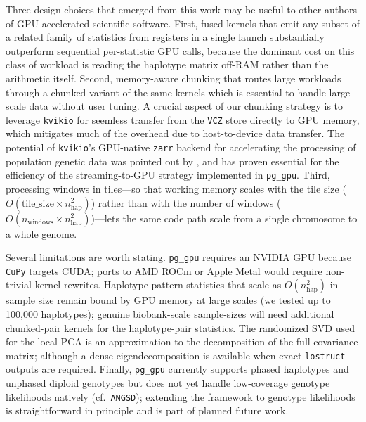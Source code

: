 \documentclass[12pt]{article}
\newcommand{\citep}{\parencite}
\newcommand{\citet}{\textcite}
\newcommand{\pggpu}{\texttt{pg\_gpu}\xspace}
\newcommand{\angsd}{\texttt{ANGSD}\xspace}
\newcommand{\cupy}{\texttt{CuPy}\xspace}
\newcommand{\zarr}{\texttt{zarr}\xspace}
\newcommand{\vcz}{\texttt{VCZ}\xspace}
\newcommand{\lostruct}{\texttt{lostruct}\xspace}
\newcommand{\kvikio}{\texttt{kvikio}\xspace}
\begin{document}
Three design choices that emerged from this work may be useful to
other authors of GPU-accelerated scientific software. First, fused
kernels that emit any subset of a related family of statistics from
registers in a single launch substantially outperform sequential
per-statistic GPU calls, because the dominant cost on this class of
workload is reading the haplotype matrix off-RAM rather than the
arithmetic itself. 
Second, memory-aware chunking that
routes large workloads through a
chunked variant of the same kernels which is 
essential to handle large-scale data without user
tuning. 
A crucial aspect of our chunking strategy is to leverage
\kvikio \citep{kvikio2021} for seemless transfer from the \vcz store
directly to GPU memory, which mitigates much of the overhead 
due to host-to-device data transfer. %
The potential of \kvikio's GPU-native \zarr backend for accelerating 
the processing of population genetic data was pointed out by
\citet{czech2024vcz}, and has proven essential for the efficiency of the
streaming-to-GPU strategy implemented in \pggpu.
Third, processing windows in tiles---so that working memory
scales with the tile size ($O(\text{tile\_size}\times n_{\text{hap}}^2)$)
rather than with the number of windows ($O(n_{\text{windows}}\times n_{\text{hap}}^2)$)---lets
the same code path scale from a single chromosome to a whole genome.

Several limitations are worth stating. \pggpu requires an NVIDIA GPU
because \cupy targets CUDA; ports to AMD ROCm or Apple Metal would
require non-trivial kernel rewrites. Haplotype-pattern statistics
that scale as $O(n_{\text{hap}}^2)$ in sample size remain bound by
GPU memory at large scales (we tested up to 100{,}000 haplotypes);
genuine biobank-scale sample-sizes will need additional chunked-pair
kernels for the haplotype-pair statistics. The randomized SVD
used for the local PCA is an approximation to the
decomposition of the full covariance matrix;
although a dense eigendecomposition is available when exact \lostruct outputs
are required.
Finally, \pggpu currently supports phased haplotypes and unphased
diploid genotypes but does not yet handle low-coverage genotype
likelihoods natively (cf.\ \angsd); extending the framework to
genotype likelihoods is straightforward in principle and is
part of planned future work.
\end{document}
